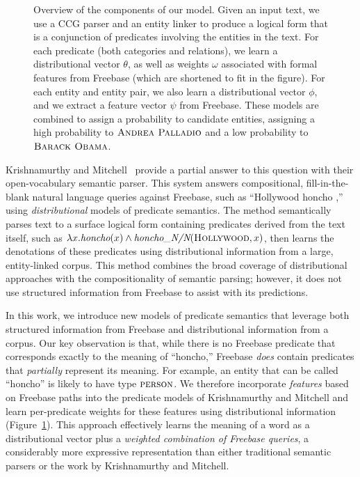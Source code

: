 \documentclass[11pt]{article}
\newcommand{\figref}[1]{Figure~\ref{fig:#1}}
\newcommand{\blank}{\underline{\hspace{.5cm}}}
\newcommand{\lexicalpredicate}[1]{\ensuremath{\textit{#1}}}
\newcommand{\formalpredicate}[1]{\ensuremath{\textsc{#1}}}
\newcommand{\entity}[1]{\ensuremath{\textsc{#1}}}
\begin{document}
\begin{figure*}[ht]
  \vspace{-.1in}
  \caption{Overview of the components of our model.  Given an input text, we
  use a CCG parser and an entity linker to produce a logical form that is a
  conjunction of predicates involving the entities in the text.  For each
  predicate (both categories and relations), we learn a distributional vector
  $\theta$, as well as weights $\omega$ associated with formal features from
  Freebase (which are shortened to fit in the figure).  For each entity and
  entity pair, we also learn a distributional vector $\phi$, and we extract a
  feature vector $\psi$ from Freebase.  These models are combined to assign a
  probability to candidate entities, assigning a high probability to
  \entity{Andrea Palladio} and a low probability to \entity{Barack Obama}.}
  \label{fig:overview}
  \vspace{-.1in}
\end{figure*}

Krishnamurthy and
Mitchell~ provide a
partial answer to this question with their open-vocabulary semantic parser.
This system answers compositional, fill-in-the-blank natural language queries
against Freebase, such as ``Hollywood honcho \blank{},'' using
\emph{distributional} models of predicate semantics. The method semantically
parses text to a surface logical form containing predicates derived from the
text itself, such as $\lambda x.\lexicalpredicate{honcho}(x) \land
\lexicalpredicate{honcho\_N/N}(\entity{Hollywood}, x)$, then learns the
denotations of these predicates using distributional information from a large,
entity-linked corpus. This method combines the broad coverage of distributional
approaches with the compositionality of semantic parsing; however, it does not
use structured information from Freebase to assist with its predictions.

In this work, we introduce new models of predicate semantics that leverage both
structured information from Freebase and distributional information from a
corpus. Our key observation is that, while there is no Freebase predicate that
corresponds exactly to the meaning of ``honcho,'' Freebase \emph{does} contain
predicates that \emph{partially} represent its meaning. For example, an entity
that can be called ``honcho'' is likely to have type \formalpredicate{person}.
We therefore incorporate \emph{features} based on Freebase paths into the
predicate models of Krishnamurthy and Mitchell and learn per-predicate weights
for these features using distributional information (\figref{overview}). This
approach effectively learns the meaning of a word as a distributional vector
plus a \emph{weighted combination of Freebase queries}, a considerably more
expressive representation than either traditional semantic parsers or the work
by Krishnamurthy and Mitchell.
\end{document}

